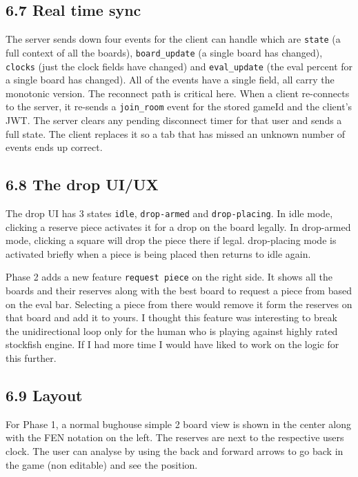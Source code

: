 \documentclass[11pt,a4paper]{article}
\begin{document}
\subsection*{6.7 Real time sync}
The server sends down four events for the client can handle which are \texttt{state} (a full context of all the boards), \texttt{board\_update} (a single board has changed), \texttt{clocks} (just the clock fields have changed) and \texttt{eval\_update} (the eval percent for a single board has changed). All of the events have a single field, all carry the monotonic version. The reconnect path is critical here. When a client re-connects to the server, it re-sends a \texttt{join\_room} event for the stored gameId and the client’s JWT. The server clears any pending disconnect timer for that user and sends a full state. The client replaces it so a tab that has missed an unknown number of events ends up correct.

\subsection*{6.8 The drop UI/UX}
The drop UI has 3 states \texttt{idle}, \texttt{drop-armed} and \texttt{drop-placing}. In idle mode, clicking a reserve piece activates it for a drop on the board legally. In drop-armed mode, clicking a square will drop the piece there if legal. drop-placing mode is activated briefly when a piece is being placed then returns to idle again.

Phase 2 adds a new feature \texttt{request piece} on the right side. It shows all the boards and their reserves along with the best board to request a piece from based on the eval bar. Selecting a piece from there would remove it form the reserves on that board and add it to yours. I thought this feature was interesting to break the unidirectional loop only for the human who is playing against highly rated stockfish engine. If I had more time I would have liked to work on the logic for this further.

\subsection*{6.9 Layout}

For Phase 1, a normal bughouse simple 2 board view is shown in the center along with the FEN notation on the left. The reserves are next to the respective users clock. The user can analyse by using the back and forward arrows to go back in the game (non editable) and see the position.
\end{document}
